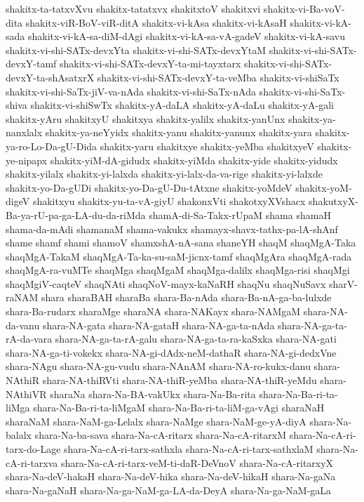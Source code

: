{shakitx-ta-tatxvXvu
shakitx-tatatxvx
shakitxtoV
shakitxvi
shakitx-vi-Ba-voV-dita
shakitx-viR-BoV-viR-ditA
shakitx-vi-kAsa
shakitx-vi-kAsaH
shakitx-vi-kA-sada
shakitx-vi-kA-sa-diM-dAgi
shakitx-vi-kA-sa-vA-gadeV
shakitx-vi-kA-savu
shakitx-vi-shi-SATx-devxYta
shakitx-vi-shi-SATx-devxYtaM
shakitx-vi-shi-SATx-devxY-tamf
shakitx-vi-shi-SATx-devxY-ta-mi-tayxtarx
shakitx-vi-shi-SATx-devxY-ta-shAsatxrX
shakitx-vi-shi-SATx-devxY-ta-veMba
shakitx-vi-shiSaTx
shakitx-vi-shi-SaTx-jiV-va-nAda
shakitx-vi-shi-SaTx-nAda
shakitx-vi-shi-SaTx-shiva
shakitx-vi-shiSwTx
shakitx-yA-daLA
shakitx-yA-daLu
shakitx-yA-gali
shakitx-yAru
shakitxyU
shakitxya
shakitx-yalilx
shakitx-yanUnx
shakitx-ya-nanxlalx
shakitx-ya-neYyidx
shakitx-yanu
shakitx-yanunx
shakitx-yara
shakitx-ya-ro-Lo-Da-gU-Dida
shakitx-yaru
shakitxye
shakitx-yeMba
shakitxyeV
shakitx-ye-nipapx
shakitx-yiM-dA-gidudx
shakitx-yiMda
shakitx-yide
shakitx-yidudx
shakitx-yilalx
shakitx-yi-lalxda
shakitx-yi-lalx-da-va-rige
shakitx-yi-lalxde
shakitx-yo-Da-gUDi
shakitx-yo-Da-gU-Du-tAtxne
shakitx-yoMdeV
shakitx-yoM-digeV
shakitxyu
shakitx-yu-ta-vA-giyU
shakonxVti
shakotxyXVshacx
shakutxyX-Ba-ya-rU-pa-ga-LA-du-da-riMda
shamA-di-Sa-Takx-rUpaM
shama
shamaH
shama-da-mAdi
shamanaM
shama-vakukx
shamayx-shavx-tathx-pa-lA-shAnf
shame
shamf
shami
shamoV
shamxshA-nA-sana
shaneYH
shaqM
shaqMgA-Taka
shaqMgA-TakaM
shaqMgA-Ta-ka-su-saM-jicnx-tamf
shaqMgAra
shaqMgA-rada
shaqMgA-ra-vuMTe
shaqMga
shaqMgaM
shaqMga-dalilx
shaqMga-risi
shaqMgi
shaqMgiV-caqteV
shaqNAti
shaqNoV-mayx-kaNaRH
shaqNu
shaqNuSavx
sharV-raNAM
shara
sharaBAH
sharaBa
shara-Ba-nAda
shara-Ba-nA-ga-ba-lulxde
shara-Ba-rudarx
sharaMge
sharaNA
shara-NAKayx
shara-NAMgaM
shara-NA-da-vanu
shara-NA-gata
shara-NA-gataH
shara-NA-ga-ta-nAda
shara-NA-ga-ta-rA-da-vara
shara-NA-ga-ta-rA-galu
shara-NA-ga-ta-ra-kaSxka
shara-NA-gati
shara-NA-ga-ti-vokekx
shara-NA-gi-dAdx-neM-dathaR
shara-NA-gi-dedxVne
shara-NAgu
shara-NA-gu-vudu
shara-NAnAM
shara-NA-ro-kukx-danu
shara-NAthiR
shara-NA-thiRVti
shara-NA-thiR-yeMba
shara-NA-thiR-yeMdu
shara-NAthiVR
sharaNa
shara-Na-BA-vakUkx
shara-Na-Ba-rita
shara-Na-Ba-ri-ta-liMga
shara-Na-Ba-ri-ta-liMgaM
shara-Na-Ba-ri-ta-liM-ga-vAgi
sharaNaH
sharaNaM
shara-NaM-ga-Lelalx
shara-NaMge
shara-NaM-ge-yA-diyA
shara-Na-balalx
shara-Na-ba-sava
shara-Na-cA-ritarx
shara-Na-cA-ritarxM
shara-Na-cA-ri-tarx-do-Lage
shara-Na-cA-ri-tarx-sathxla
shara-Na-cA-ri-tarx-sathxlaM
shara-Na-cA-ri-tarxva
shara-Na-cA-ri-tarx-veM-ti-daR-DeVnoV
shara-Na-cA-ritarxyX
shara-Na-deV-hakaH
shara-Na-deV-hika
shara-Na-deV-hikaH
shara-Na-gaNa
shara-Na-gaNaH
shara-Na-ga-NaM-ga-LA-da-DeyA
shara-Na-ga-NaM-gaLa
}
